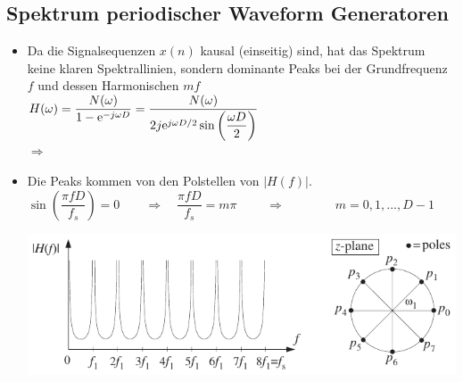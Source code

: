 	\subsection{Spektrum periodischer Waveform Generatoren}
		\begin{itemize}
		 \item Da die Signalsequenzen $x(n)$ kausal (einseitig) sind, hat das Spektrum keine klaren Spektrallinien, sondern dominante Peaks bei der Grundfrequenz $f$ und dessen Harmonischen $mf$\\[0.2cm]
		 $H(\omega) = \dfrac{N(\omega)}{1-\mathrm{e}^{-j\omega D}} = \dfrac{N(\omega)}{2j\mathrm{e}^{j\omega D/2}\sin\left(\dfrac{\omega D}{2}\right)}\quad$\\[0.2cm]
		 $\Rightarrow\qquad$$\quad$\\[-0.1cm]
		 \item Die Peaks kommen von den Polstellen von $|H(f)|$.\\[0.2cm]
		 $\sin\left(\dfrac{\pi fD}{f_s}\right) = 0\qquad\Rightarrow\quad\dfrac{\pi fD}{f_s}=m\pi$
		 $\qquad\Rightarrow\qquad$$\qquad m=0,1,...,D-1$
		 \\[0.3cm]
		 \begin{minipage}{0.75\textwidth}
			\includegraphics[width = \textwidth]{pic/SpektrumperiodischesDigitalesSignal.pdf}
		 \end{minipage}
		 \begin{minipage}{0.03\textwidth}$ $\end{minipage}
		 \begin{minipage}{0.27\textwidth}
		 \end{minipage}
		\end{itemize}
\newpage
